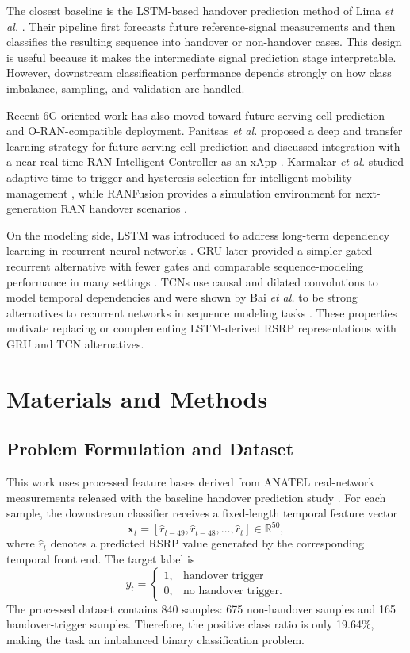\documentclass[conference]{IEEEtran}
\begin{document}
The closest baseline is the LSTM-based handover prediction method of Lima \emph{et al.} \cite{lima2023}. Their pipeline first forecasts future reference-signal measurements and then classifies the resulting sequence into handover or non-handover cases. This design is useful because it makes the intermediate signal prediction stage interpretable. However, downstream classification performance depends strongly on how class imbalance, sampling, and validation are handled.

Recent 6G-oriented work has also moved toward future serving-cell prediction and O-RAN-compatible deployment. Panitsas \emph{et al.} proposed a deep and transfer learning strategy for future serving-cell prediction and discussed integration with a near-real-time RAN Intelligent Controller as an xApp \cite{panitsas2024}. Karmakar \emph{et al.} studied adaptive time-to-trigger and hysteresis selection for intelligent mobility management \cite{karmakar2022}, while RANFusion provides a simulation environment for next-generation RAN handover scenarios \cite{ranfusion2024}.

On the modeling side, LSTM was introduced to address long-term dependency learning in recurrent neural networks \cite{hochreiter1997}. GRU later provided a simpler gated recurrent alternative with fewer gates and comparable sequence-modeling performance in many settings \cite{cho2014, chung2014}. TCNs use causal and dilated convolutions to model temporal dependencies and were shown by Bai \emph{et al.} to be strong alternatives to recurrent networks in sequence modeling tasks \cite{bai2018}. These properties motivate replacing or complementing LSTM-derived RSRP representations with GRU and TCN alternatives.

\section{Materials and Methods}
\subsection{Problem Formulation and Dataset}
This work uses processed feature bases derived from ANATEL real-network measurements released with the baseline handover prediction study \cite{lima2023}. For each sample, the downstream classifier receives a fixed-length temporal feature vector
\begin{equation}
\mathbf{x}_t = [\hat{r}_{t-49}, \hat{r}_{t-48}, \ldots, \hat{r}_t] \in \mathbb{R}^{50},
\end{equation}
where $\hat{r}_t$ denotes a predicted RSRP value generated by the corresponding temporal front end. The target label is
\begin{equation}
y_t = \begin{cases}
1, & \text{handover trigger} \\
0, & \text{no handover trigger}.
\end{cases}
\end{equation}
The processed dataset contains 840 samples: 675 non-handover samples and 165 handover-trigger samples. Therefore, the positive class ratio is only 19.64\%, making the task an imbalanced binary classification problem.
\end{document}
